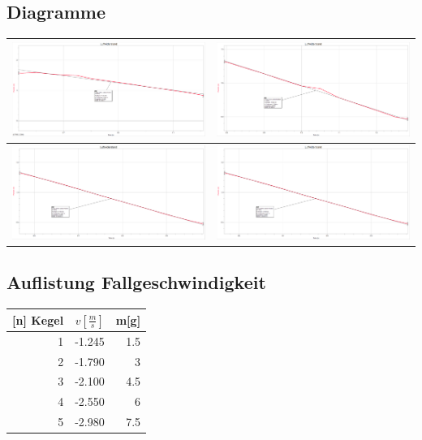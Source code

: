 \subsection{Diagramme}

\begin{tabular}{|l|l|}
	\hline
	\includegraphics[width=8cm]{graphs/scr1} &
	\includegraphics[width=8cm]{graphs/scr2}
	\\\hline 
	\includegraphics[width=8cm]{graphs/scr3} &
	\includegraphics[width=8cm]{graphs/scr4}
	\\\hline 
	
\end{tabular}


\subsection{Auflistung Fallgeschwindigkeit}

\begin{tabular}{rrr}
	\textbf{[n] Kegel} & \(v[\frac{m}{s}]\) & m[g] \\ \hline
	1 & -1.245 & 1.5 \\
	2 & -1.790 & 3 \\
	3 & -2.100 & 4.5 \\
	4 & -2.550 & 6 \\
	5 & -2.980 & 7.5 \\
\end{tabular}
